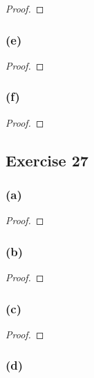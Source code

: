 \documentclass[14pt]{extarticle}
\begin{document}
\begin{proof}

\end{proof}

\subsubsection{(e)}

\begin{proof}

\end{proof}

\subsubsection{(f)}

\begin{proof}

\end{proof}

\subsection{Exercise 27}

\subsubsection{(a)}

\begin{proof}

\end{proof}

\subsubsection{(b)}

\begin{proof}

\end{proof}

\subsubsection{(c)}

\begin{proof}

\end{proof}

\subsubsection{(d)}
\end{document}
